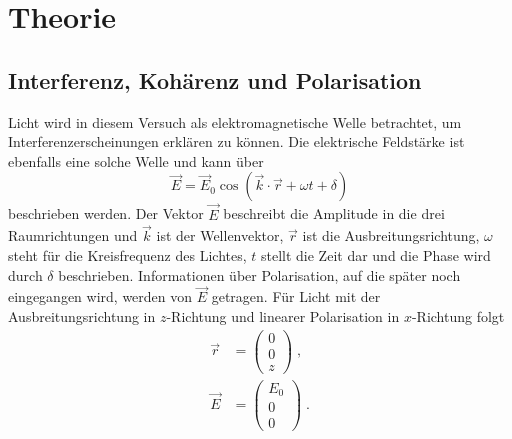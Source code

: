 \section{Theorie}
\label{sec:Theorie}

\subsection{Interferenz, Kohärenz und Polarisation}
\label{sec:polarisation}
Licht wird in diesem Versuch als elektromagnetische Welle betrachtet, um Interferenzerscheinungen erklären zu können. Die elektrische Feldstärke ist 
ebenfalls eine solche Welle und kann über 
\begin{equation}
    \vec{E} = \vec{E}_0\cos{(\vec{k}\cdot \vec{r}+\omega t+ \delta)}
    \label{eqn:EVektor}
\end{equation}
beschrieben werden. Der Vektor $\vec{E}$ beschreibt die Amplitude in die drei Raumrichtungen und $\vec{k}$ ist der Wellenvektor, $\vec{r}$ ist die Ausbreitungsrichtung, $\omega$ steht für die Kreisfrequenz des Lichtes, $t$ stellt die Zeit dar und die Phase wird durch $\delta$ beschrieben. Informationen über Polarisation, auf die später noch eingegangen wird, werden von $\vec{E}$ getragen. Für Licht mit der Ausbreitungsrichtung in $z$-Richtung und linearer Polarisation in $x$-Richtung folgt
\begin{align*}
    \vec{r}&= \left(\begin{array}{c}0 \\ 0 \\ z\end{array}\right) \; ,\\
    \vec{E}&= \left(\begin{array}{c} E_0 \\ 0 \\ 0\end{array}\right)\; .
\end{align*}


